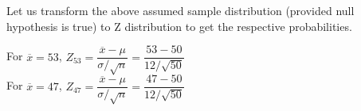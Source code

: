 \documentclass[float=false,crop=false]{standalone}
\begin{document}
    ~
    \begin{center}
    \end{center}
    { \hspace*{\fill} \\}
    
    Let us transform the above assumed sample distribution (provided null
hypothesis is true) to Z distribution to get the respective
probabilities.

For \(\overline{x} = 53\),
\(Z_{53} = \dfrac{\overline{x} - \mu}{\sigma/\sqrt{n}} = \dfrac{53-50}{12/\sqrt{50}}\)\\
For \(\overline{x} = 47\),
\(Z_{47} = \dfrac{\overline{x} - \mu}{\sigma/\sqrt{n}} = \dfrac{47-50}{12/\sqrt{50}}\)
\end{document}
